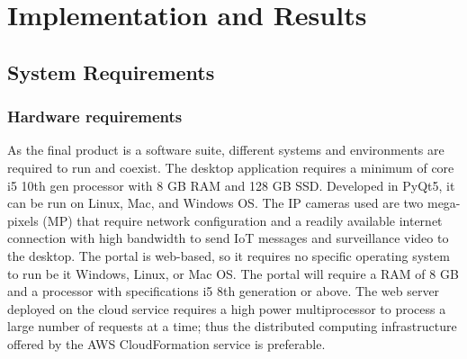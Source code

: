
\chapter{Implementation and Results} %
\label{Chapter5}
\section{System Requirements}
\subsection{Hardware requirements}
As the final product is a software suite, different systems and environments are required to run and coexist. The desktop application requires a minimum of core i5 10th gen processor with 8 GB RAM and 128 GB SSD. Developed in PyQt5, it can be run on Linux, Mac, and Windows OS. The IP cameras used are two mega-pixels (MP) that require network configuration and a readily available internet connection with high bandwidth to send IoT messages and surveillance video to the desktop. The portal is web-based, so it requires no specific operating system to run be it Windows, Linux, or Mac OS. The portal will require a RAM of 8 GB and a processor with specifications i5 8th generation or above. The web server deployed on the cloud service requires a high power multiprocessor to process a large number of requests at a time; thus the distributed computing infrastructure offered by the AWS CloudFormation service is preferable.

